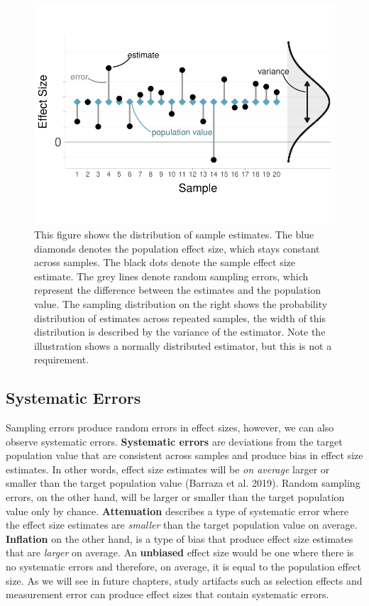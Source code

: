 \documentclass[
  letterpaper,
  DIV=11,
  numbers=noendperiod]{scrreprt}
\begin{document}
\begin{figure}[H]

{\centering \includegraphics{intro_files/figure-pdf/fig-3.1-1.pdf}

}

\caption{\label{fig-3.1}This figure shows the distribution of sample
estimates. The blue diamonds denotes the population effect size, which
stays constant across samples. The black dots denote the sample effect
size estimate. The grey lines denote random sampling errors, which
represent the difference between the estimates and the population value.
The sampling distribution on the right shows the probability
distribution of estimates across repeated samples, the width of this
distribution is described by the variance of the estimator. Note the
illustration shows a normally distributed estimator, but this is not a
requirement.}

\end{figure}

\hypertarget{systematic-errors}{%
\subsection{Systematic Errors}\label{systematic-errors}}

Sampling errors produce random errors in effect sizes, however, we can
also observe systematic errors. \textbf{Systematic errors} are
deviations from the target population value that are consistent across
samples and produce bias in effect size estimates. In other words,
effect size estimates will be \emph{on average} larger or smaller than
the target population value (Barraza et al. 2019). Random sampling
errors, on the other hand, will be larger or smaller than the target
population value only by chance. \textbf{Attenuation} describes a type
of systematic error where the effect size estimates are \emph{smaller}
than the target population value on average. \textbf{Inflation} on the
other hand, is a type of bias that produce effect size estimates that
are \emph{larger} on average. An \textbf{unbiased} effect size would be
one where there is no systematic errors and therefore, on average, it is
equal to the population effect size. As we will see in future chapters,
study artifacts such as selection effects and measurement error can
produce effect sizes that contain systematic errors.
\end{document}
